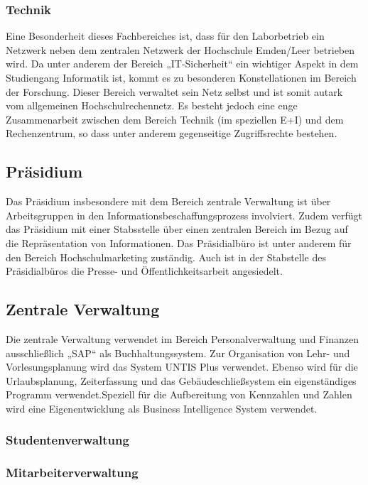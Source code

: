 \subsubsection{Technik}
Eine Besonderheit dieses Fachbereiches ist, dass für den Laborbetrieb ein Netzwerk neben dem zentralen Netzwerk der Hochschule Emden/Leer betrieben wird. Da unter anderem der Bereich „IT-Sicherheit“ ein wichtiger Aspekt in dem Studiengang Informatik ist, kommt es zu besonderen Konstellationen im Bereich der Forschung. Dieser Bereich verwaltet sein Netz selbst und ist somit autark vom allgemeinen Hochschulrechennetz. Es besteht jedoch eine enge Zusammenarbeit zwischen dem Bereich Technik (im speziellen E+I) und dem Rechenzentrum, so dass unter anderem gegenseitige Zugriffsrechte bestehen. 

\subsection{Präsidium}
\label{subsection_zustaendigkeiten_praesidium}
Das Präsidium insbesondere mit dem Bereich zentrale Verwaltung ist über  Arbeitsgruppen in den Informationsbeschaffungsprozess involviert. Zudem verfügt das Präsidium mit einer Stabsstelle über einen zentralen Bereich im Bezug auf die Repräsentation von Informationen.  Das Präsidialbüro ist unter anderem für den Bereich Hochschulmarketing zuständig. Auch ist in der Stabstelle des Präsidialbüros die Presse- und Öffentlichkeitsarbeit angesiedelt.

\subsection{Zentrale Verwaltung}
Die zentrale Verwaltung verwendet im Bereich Personalverwaltung und Finanzen ausschließlich „SAP“ als Buchhaltungssystem. Zur Organisation von Lehr- und Vorlesungsplanung wird das System UNTIS Plus verwendet. Ebenso wird für die Urlaubsplanung, Zeiterfassung und das Gebäudeschließsystem ein eigenständiges Programm verwendet.Speziell für die Aufbereitung von Kennzahlen und Zahlen wird eine Eigenentwicklung als Business Intelligence System verwendet. 

\subsubsection{Studentenverwaltung}
\subsubsection{Mitarbeiterverwaltung}
